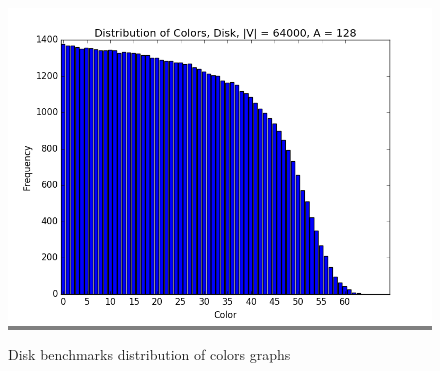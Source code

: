 \documentclass{article}
\begin{document}
\begin{figure}
\begin{minipage}{0.45\textwidth}
    \colorbox{gray}{\includegraphics[width=\linewidth]{./graphs/hist_colors_disk_2.png}}
    \end{minipage}

    \caption{Disk benchmarks distribution of colors graphs}
    \label{diskcolorhists}
\end{figure}
\end{document}
